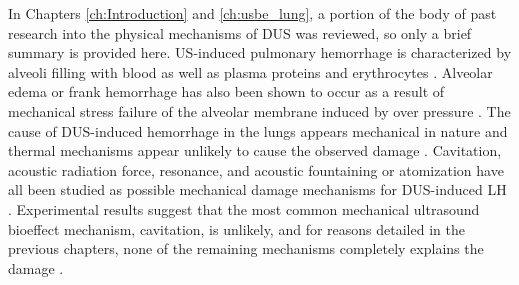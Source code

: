 In Chapters \ref{ch:Introduction} and \ref{ch:usbe_lung}, a portion of
the body of past research into the physical mechanisms of \ac{DUS} was
reviewed, so only a brief summary is provided
here. \ac{US}-induced pulmonary hemorrhage is characterized by alveoli
filling with blood as well as plasma proteins and erythrocytes
\citep{Miller2016a,Penney1993a}. Alveolar edema or frank hemorrhage
has also been shown to occur as a result of mechanical stress failure
of the alveolar membrane induced by over pressure
\citep{West1991}. The cause of \ac{DUS}-induced hemorrhage in the
lungs appears mechanical in nature and thermal mechanisms appear
unlikely to cause the observed damage \citep{Zachary2006,
  Dalecki2004}. Cavitation, acoustic radiation force, resonance, and
acoustic fountaining or atomization have all been studied as possible
mechanical damage mechanisms for \ac{DUS}-induced \ac{LH}
\citep{Holland1996,Miller2016a,Jabaraj2012,Jabaraj2013,Jabaraj2013a,Tjan2007,Simon2012}.
Experimental results suggest that the most common mechanical
ultrasound bioeffect mechanism, cavitation, is unlikely, and for
reasons detailed in the previous chapters, none of the remaining
mechanisms completely explains the damage \citep{OBrien2000,
  Raeman1996, Miller2016a}.

